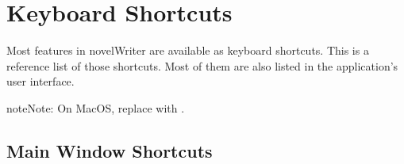 \documentclass[a4paper,11pt,english]{sphinxmanual}
\begin{document}
\sphinxstepscope


\chapter{Keyboard Shortcuts}
\label{\detokenize{usage_shortcuts:keyboard-shortcuts}}\label{\detokenize{usage_shortcuts:a-kb}}\label{\detokenize{usage_shortcuts::doc}}
\sphinxAtStartPar
Most features in novelWriter are available as keyboard shortcuts. This is a reference list of those
shortcuts. Most of them are also listed in the application’s user interface.

\begin{sphinxadmonition}{note}{Note:}
\sphinxAtStartPar
On MacOS, replace  with .
\end{sphinxadmonition}


\section{Main Window Shortcuts}
\label{\detokenize{usage_shortcuts:main-window-shortcuts}}\label{\detokenize{usage_shortcuts:a-kb-main}}
\end{document}
